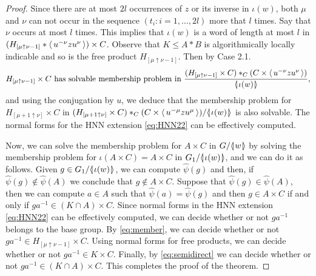 \documentclass[12pt, a4paper]{amsart}
\theoremstyle{remark}
\theoremstyle{definition}
\begin{document}
\begin{proof}
Since there are at most $2l$ occurrences of $z$ or its inverse in $\iota(w)$, both $\mu$ and $\nu$  can not occur in the sequence $(t_i:i=1,\dots, 2l)$ more that $l$ times. Say that $\nu$ occurs at  most $l$ times. This implies that $\iota(w)$ is a word of length at most $l$ in $(H_{[\mu\uparrow \nu-1]}*{\langle\mkern3mu{u^{-\nu}zu^{\nu}}\mkern3mu\rangle})\times C$. Observe that $K\leqslant A*B$ is algorithmically locally indicable and so is the free product $H_{[\mu \uparrow \nu-1]}$. Then by Case 2.1. 
\begin{equation}\label{eq:member} 
\text{$H_{[\mu  \uparrow \nu-1]}\times C$ has solvable membership problem in $\dfrac{(H_{[\mu\uparrow \nu-1]}\times C)*_C(C\times {\langle\mkern3mu{u^{-\nu}zu^{\nu}}\mkern3mu\rangle})}{{{\langle}{\mkern-3.7mu}{\lvert}{\mkern1.2mu}{{\iota(w)}}{\mkern1.2mu}{\rvert}{\mkern-3.7mu}{\rangle}}}$,}
\end{equation} 
and using the conjugation by $u$, we deduce that the membership problem for $H_{[\mu+1  \uparrow \nu]}\times C$ in $(H_{[\mu+1\uparrow \nu]}\times C)*_C(C\times {\langle\mkern3mu{u^{-\mu}zu^{\mu}}\mkern3mu\rangle})/{{\langle}{\mkern-3.7mu}{\lvert}{\mkern1.2mu}{{\iota(w)}}{\mkern1.2mu}{\rvert}{\mkern-3.7mu}{\rangle}}$ is also solvable. The normal forms for the HNN extension \eqref{eq:HNN22} can be effectively computed.

Now, we can solve the membership problem for $A\times C$ in $G/{{\langle}{\mkern-3.7mu}{\lvert}{\mkern1.2mu}{{w}}{\mkern1.2mu}{\rvert}{\mkern-3.7mu}{\rangle}}$ by solving the membership problem for $\iota (A\times C)=A\times C$ in $G_1/{{\langle}{\mkern-3.7mu}{\lvert}{\mkern1.2mu}{{\iota(w)}}{\mkern1.2mu}{\rvert}{\mkern-3.7mu}{\rangle}}$, and we can do it as follows. Given $g\in G_1/{{\langle}{\mkern-3.7mu}{\lvert}{\mkern1.2mu}{{\iota(w)}}{\mkern1.2mu}{\rvert}{\mkern-3.7mu}{\rangle}}$,  we can compute $\widehat{\psi}(g)$ and then, if $\widehat{\psi}(g)\notin \widehat{\psi}(A)$ we conclude that $g\notin A\times C$. Suppose that $\widehat{\psi}(g)\in \widehat{\psi}(A)$, then we can compute $a\in A$ such that $\widehat{\psi}(a)=\widehat{\psi}(g)$ and then $g\in A\times C$ if and only if $ga^{-1}\in (K\cap A)\times C$. Since normal forms in the HNN extension \eqref{eq:HNN22} can be effectively computed, we can decide whether or not $ga^{-1}$ belongs to the base group. By \eqref{eq:member}, we can decide whether or not $ga^{-1}\in H_{[\mu \uparrow \nu-1]}\times C$. Using normal forms for free products, we can decide whether or not $ga^{-1}\in K\times C$. Finally, by \eqref{eq:semidirect} we can decide whether or not $ga^{-1}\in (K\cap A)\times C$. This completes the proof of 
the theorem.
\end{proof}
\end{document}
